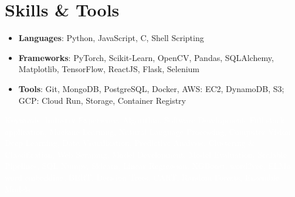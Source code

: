 \documentclass[letterpaper,11pt]{article}
\newcommand{\resumeSubHeadingListStart}{\begin{itemize}[leftmargin=*]}
\newcommand{\resumeSubHeadingListEnd}{\end{itemize}}
\begin{document}
\vspace{-5pt}
\section{Skills \& Tools}
  \resumeSubHeadingListStart
    \item{
      \textbf{Languages}{: Python, JavaScript, C, Shell Scripting}
    }
    \item{
      \textbf{Frameworks}{: PyTorch, Scikit-Learn, OpenCV, Pandas, SQLAlchemy, Matplotlib, TensorFlow, ReactJS, Flask, Selenium}
    }
    \item{
      \textbf{Tools}{: Git, MongoDB, PostgreSQL, Docker, AWS: EC2, DynamoDB, S3; GCP: Cloud Run, Storage, Container Registry}
    }
  \resumeSubHeadingListEnd



\vspace{-3pt}
\tiny\textcolor{White}{Keywords: Industry Experience, Algorithm, Software Development, Full stack application, Machine Learning, Natural Language Processing, Computer Vision}
\vspace{-10pt}
\tiny\textcolor{White}{Deep Learning, Data Visualization, Predictive Analysis, Clustering \& Classification, Web Scraping, Model Development, Model Evaluation, Scalable Pipelines, SQL}
\vspace{-10pt}
\tiny\textcolor{White}{Numpy, Sklearn, Linear Regression, XGBoost, word2vec, ELMo word embedding, BERT, Decision Trees, CART, Random Forests, Ensemble Models}
\end{document}
